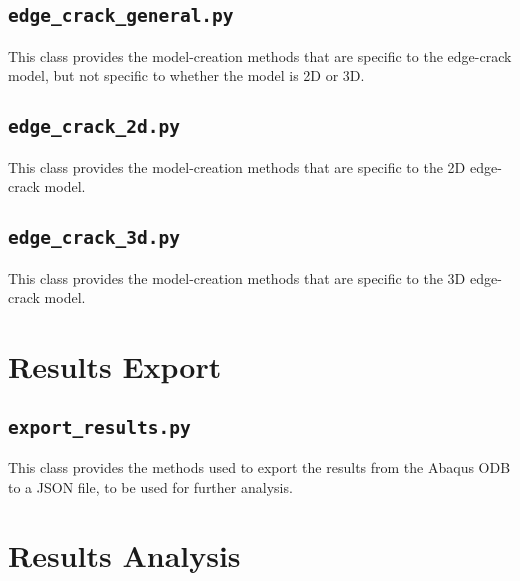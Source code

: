 \newpage
\subsection{\texttt{edge\_crack\_general.py}}

This class provides the model-creation methods that are specific to the edge-crack model, but not specific to whether the model is 2D or 3D.



\newpage
\subsection{\texttt{edge\_crack\_2d.py}}

This class provides the model-creation methods that are specific to the 2D edge-crack model.



\newpage
\subsection{\texttt{edge\_crack\_3d.py}}

This class provides the model-creation methods that are specific to the 3D edge-crack model.



\newpage
\section{Results Export}

\subsection{\texttt{export\_results.py}}

This class provides the methods used to export the results from the Abaqus ODB to a JSON file, to be used for further analysis.



\newpage
\section{Results Analysis}

